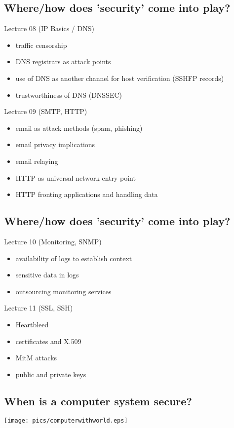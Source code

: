 \documentclass[xga]{xdvislides}
\begin{document}
\subsection{Where/how does 'security' come into play?}
Lecture 08 (IP Basics / DNS)
\begin{itemize}
	\item traffic censorship
	\item DNS registrars as attack points
	\item use of DNS as another channel for host verification (SSHFP records)
	\item trustworthiness of DNS (DNSSEC)
\end{itemize}
\vspace{.5in}
Lecture 09 (SMTP, HTTP)
\begin{itemize}
	\item email as attack methods (spam, phishing)
	\item email privacy implications
	\item email relaying
	\item HTTP as universal network entry point
	\item HTTP fronting applications and handling data
\end{itemize}

\subsection{Where/how does 'security' come into play?}
Lecture 10 (Monitoring, SNMP)
\begin{itemize}
	\item availability of logs to establish context
	\item sensitive data in logs
	\item outsourcing monitoring services
\end{itemize}
\vspace{.5in}
Lecture 11 (SSL, SSH)
\begin{itemize}
	\item Heartbleed
	\item certificates and X.509
	\item MitM attacks
	\item public and private keys
\end{itemize}

\subsection{When is a computer system secure?}
\vspace*{\fill}
\begin{center}
	\texttt{[image: pics/computerwithworld.eps]}
\end{center}
\vspace*{\fill}
\end{document}
